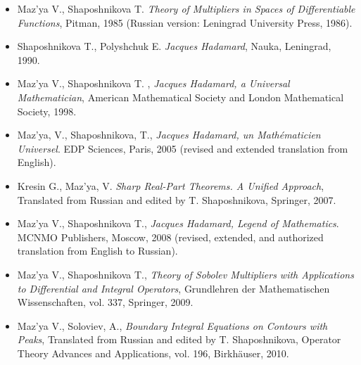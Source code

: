 \documentclass{article}
\begin{document}

\begin{itemize}
         \item Maz'ya V., Shaposhnikova T. {\it Theory of Multipliers 
in Spaces of
               Differentiable Functions}, Pitman, 1985 (Russian
               version: Leningrad University Press, 1986).
         \item Shaposhnikova T., Polyshchuk E. {\it Jacques Hadamard}, Nauka,
               Leningrad, 1990.
         \item Maz'ya V., Shaposhnikova T. , {\it Jacques Hadamard, a Universal
               Mathematician}, American Mathematical Society and
               London Mathematical Society, 1998.
         \item Maz'ya, V., Shaposhnikova, T., 
{\it Jacques Hadamard, un Math\'ematicien Universel}. EDP Sciences, Paris, 2005 
(revised and extended translation from English).
         \item Kresin G., Maz'ya, V. {\it Sharp Real-Part Theorems. A Unified Approach}, Translated from Russian and edited by T. Shaposhnikova, Springer, 2007.
         \item Maz'ya V., Shaposhnikova T., {\it Jacques Hadamard, Legend of  Mathematics}. MCNMO Publishers, Moscow, 2008 (revised,  extended, and  authorized translation from English to Russian).
\item Maz'ya V., Shaposhnikova T., {\it Theory of Sobolev Multipliers with Applications to Differential and Integral Operators}, Grundlehren der Mathematischen Wissenschaften, vol. 337, Springer, 2009.
\item Maz'ya V.,  Soloviev, A., {\it Boundary Integral Equations on Contours with Peaks}, Translated from Russian and edited by T. Shaposhnikova, 
Operator Theory Advances and Applications, vol. 196, Birkh\"auser, 2010.



\end{itemize}
\end{document}
